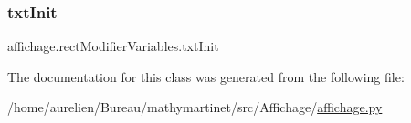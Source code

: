 \mbox{\label{classaffichage_1_1rect_modifier_variables_abf231c24af86a4b80c5ccb79d441189b}} 
\subsubsection{\texorpdfstring{txt\+Init}{txtInit}}
{\footnotesize\ttfamily affichage.\+rect\+Modifier\+Variables.\+txt\+Init}



The documentation for this class was generated from the following file\+:\begin{DoxyCompactItemize}
\item 
/home/aurelien/\+Bureau/mathymartinet/src/\+Affichage/\hyperlink{affichage_8py}{affichage.\+py}\end{DoxyCompactItemize}
